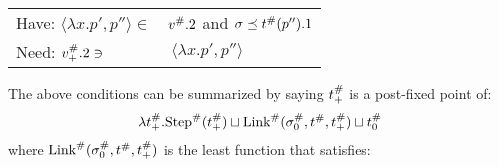 \begin{center}
\begin{tabular}{|l@{\hskip2pt}l|}
    Have: \hfill $\langle\lambda x.p',p''\rangle\in$ & ${v}^{\#}.2$ and $\sigma\preceq{t}^{\#}(p'').1$                                                                                                          \\
    Need: \hfill ${v}^{\#}_+.2\ni$                    & $\:\langle\lambda x.p',p''\rangle$                                                                                                                      \\
    \hline
  \end{tabular}
\end{center}
The above conditions can be summarized by saying ${t}^{\#}_+$ is a post-fixed point of:
\[\lambda{t}^{\#}_+.{\textnormal{Step}}^{\#}({t}^{\#}_+)\sqcup{\textnormal{Link}}^{\#}({\sigma}^{\#}_0,{t}^{\#},{t}^{\#}_+)\sqcup{t}^{\#}_0\]
where ${\textnormal{Link}}^{\#}({\sigma}^{\#}_0,{t}^{\#},{t}^{\#}_+)$ is the least function that satisfies:
